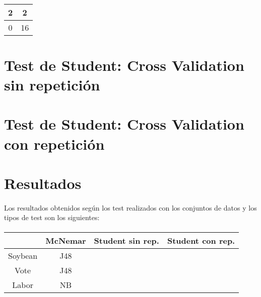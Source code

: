 \documentclass[10pt, a4paper,spanish]{article}
\begin{document}
			\paragraph{}
			\begin{center}
				\begin{tabular}{ | c | c | }
					\hline
					2 & 2 \\ \hline
					0 & 16 \\
					\hline
				\end{tabular}
			\end{center}


	\section{Test de Student: Cross Validation sin repetición}

        \paragraph{}

	\section{Test de Student: Cross Validation con repetición}

	        \paragraph{}
	\section{Resultados}

		\paragraph{}
		Los resultados obtenidos según los test realizados con los conjuntos de datos y los tipos de test son los siguientes:

		\paragraph{}
		\begin{center}
			\begin{tabular}{ | c || c | c | c | }
				\hline
				 			& McNemar	& Student sin rep. 	& Student con rep. \\ \hline \hline
				Soybean 	& J48 		& 						& \\ \hline
				Vote 		& J48 		& 						& \\ \hline
				Labor 		& NB 		& 						& \\
				\hline
			\end{tabular}
		\end{center}
\end{document}
